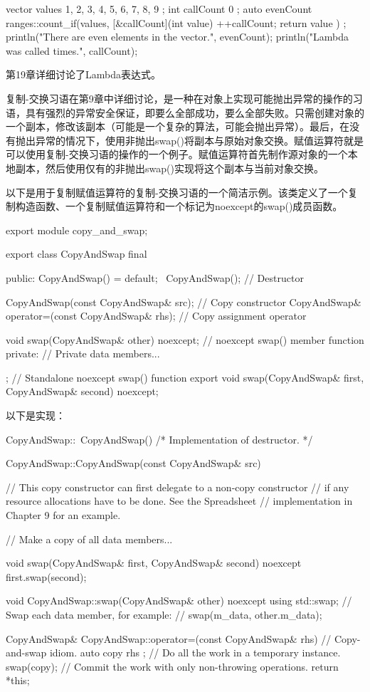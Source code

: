 \begin{cpp}
vector values { 1, 2, 3, 4, 5, 6, 7, 8, 9 };
int callCount { 0 };
auto evenCount { ranges::count_if(values,
    [&callCount](int value) {
        ++callCount;
        return value %
    })
};
println("There are {} even elements in the vector.", evenCount);
println("Lambda was called {} times.", callCount);
\end{cpp}

第19章详细讨论了Lambda表达式。


复制-交换习语在第9章中详细讨论，是一种在对象上实现可能抛出异常的操作的习语，具有强烈的异常安全保证，即要么全部成功，要么全部失败。只需创建对象的一个副本，修改该副本（可能是一个复杂的算法，可能会抛出异常）。最后，在没有抛出异常的情况下，使用非抛出swap()将副本与原始对象交换。赋值运算符就是可以使用复制-交换习语的操作的一个例子。赋值运算符首先制作源对象的一个本地副本，然后使用仅有的非抛出swap()实现将这个副本与当前对象交换。

以下是用于复制赋值运算符的复制-交换习语的一个简洁示例。该类定义了一个复制构造函数、一个复制赋值运算符和一个标记为noexcept的swap()成员函数。

\begin{cpp}
export module copy_and_swap;

export class CopyAndSwap final
{
    public:
        CopyAndSwap() = default;
        ~CopyAndSwap(); // Destructor

        CopyAndSwap(const CopyAndSwap& src); // Copy constructor
        CopyAndSwap& operator=(const CopyAndSwap& rhs); // Copy assignment operator

        void swap(CopyAndSwap& other) noexcept; // noexcept swap() member function
    private:
        // Private data members...
};
// Standalone noexcept swap() function
export void swap(CopyAndSwap& first, CopyAndSwap& second) noexcept;
\end{cpp}

以下是实现：

\begin{cpp}
CopyAndSwap::~CopyAndSwap() { /* Implementation of destructor. */ }

CopyAndSwap::CopyAndSwap(const CopyAndSwap& src)
{
    // This copy constructor can first delegate to a non-copy constructor
    // if any resource allocations have to be done. See the Spreadsheet
    // implementation in Chapter 9 for an example.

    // Make a copy of all data members...
}

void swap(CopyAndSwap& first, CopyAndSwap& second) noexcept
{
    first.swap(second);
}

void CopyAndSwap::swap(CopyAndSwap& other) noexcept
{
    using std::swap;
    // Swap each data member, for example:
    // swap(m_data, other.m_data);
}

CopyAndSwap& CopyAndSwap::operator=(const CopyAndSwap& rhs)
{
    // Copy-and-swap idiom.
    auto copy { rhs }; // Do all the work in a temporary instance.
    swap(copy); // Commit the work with only non-throwing operations.
    return *this;
}
\end{cpp}

